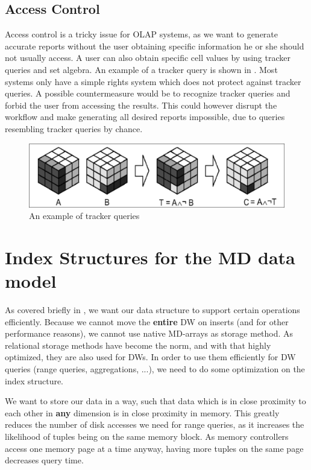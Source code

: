 \documentclass{article}
\begin{document}
\subsection{Access Control}
Access control is a tricky issue for OLAP systems, as we want to generate accurate reports without the user obtaining specific information he or she should not usually access.
A user can also obtain specific cell values by using tracker queries and set algebra.
An example of a tracker query is shown in .
Most systems only have a simple rights system which does not protect against tracker queries.
A possible countermeasure would be to recognize tracker queries and forbid the user from accessing the results.
This could however disrupt the workflow and make generating all desired reports impossible, due to queries resembling tracker queries by chance.

\begin{figure}[h]
    \centering
    \includegraphics[width=\textwidth]{tracker.png}
    \caption{An example of tracker queries}
    \label{fig:tracker}
\end{figure}

\section{Index Structures for the MD data model}
As covered briefly in , we want our data structure to support certain operations efficiently.
Because we cannot move the \textbf{entire} DW on inserts (and for other performance reasons), we cannot use native MD-arrays as storage method.
As relational storage methods have become the norm, and with that highly optimized, they are also used for DWs.
In order to use them efficiently for DW queries (range queries, aggregations, ...), we need to do some optimization on the index structure.

We want to store our data in a way, such that data which is in close proximity to each other in \textbf{any} dimension is in close proximity in memory.
This greatly reduces the number of disk accesses we need for range queries, as it increases the likelihood of tuples being on the same memory block.
As memory controllers access one memory page at a time anyway, having more tuples on the same page decreases query time.
\end{document}
